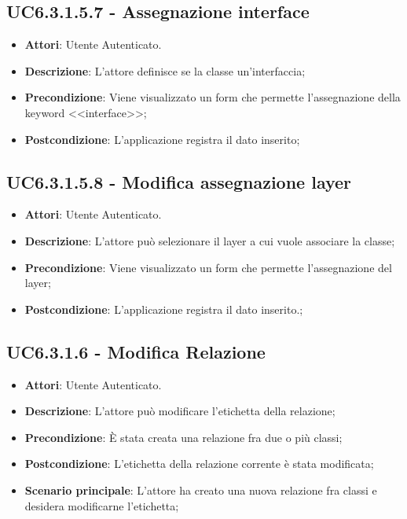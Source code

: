 \subsection{UC6.3.1.5.7 - Assegnazione interface} 
\label{ssec:UC6.3.1.5.7} 
\begin{itemize} 
\item \textbf{Attori}: Utente Autenticato.
\item \textbf{Descrizione}: L'attore definisce se la classe un'interfaccia;
\item \textbf{Precondizione}: Viene visualizzato un form che permette l'assegnazione della keyword <<interface>>;
\item \textbf{Postcondizione}: L'applicazione registra il dato inserito;
\end{itemize} 
\subsection{UC6.3.1.5.8 - Modifica assegnazione layer} 
\label{ssec:UC6.3.1.5.8} 
\begin{itemize} 
\item \textbf{Attori}: Utente Autenticato.
\item \textbf{Descrizione}: L'attore può selezionare il layer a cui vuole associare la classe;
\item \textbf{Precondizione}: Viene visualizzato un form che permette l'assegnazione del layer;
\item \textbf{Postcondizione}: L'applicazione registra il dato inserito.;
\end{itemize} 
\subsection{UC6.3.1.6 - Modifica Relazione} 
\label{ssec:UC6.3.1.6} 
\begin{itemize} 
\item \textbf{Attori}: Utente Autenticato.
\item \textbf{Descrizione}: L'attore può modificare l'etichetta della relazione;
\item \textbf{Precondizione}: È stata creata una relazione fra due o più classi;
\item \textbf{Postcondizione}: L'etichetta della relazione corrente è stata modificata;
\item \textbf{Scenario principale}: L'attore ha creato una nuova relazione fra classi e desidera modificarne l'etichetta;\end{itemize} 
